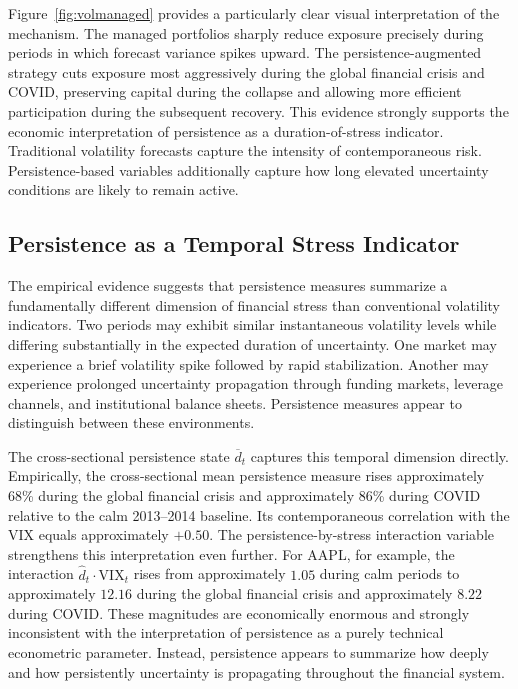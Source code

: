 \documentclass[unnumsec,webpdf,contemporary,large]{oup-authoring-template}%
\theoremstyle{thmstyleone}%
\theoremstyle{thmstyletwo}%
\theoremstyle{thmstylethree}%
\begin{document}

\FloatBarrier

Figure~\ref{fig:volmanaged} provides a particularly clear visual
interpretation of the mechanism. The managed portfolios sharply reduce
exposure precisely during periods in which forecast variance spikes upward.
The persistence-augmented strategy cuts exposure most aggressively during
the global financial crisis and COVID, preserving capital during the
collapse and allowing more efficient participation during the subsequent
recovery. This evidence strongly supports the economic interpretation of
persistence as a duration-of-stress indicator. Traditional volatility
forecasts capture the intensity of contemporaneous risk. Persistence-based
variables additionally capture how long elevated uncertainty conditions are
likely to remain active.





\subsection{Persistence as a Temporal Stress Indicator}

The empirical evidence suggests that persistence measures summarize a
fundamentally different dimension of financial stress than conventional
volatility indicators. Two periods may exhibit similar instantaneous
volatility levels while differing substantially in the expected duration of
uncertainty. One market may experience a brief volatility spike followed
by rapid stabilization. Another may experience prolonged uncertainty
propagation through funding markets, leverage channels, and institutional
balance sheets. Persistence measures appear to distinguish between these
environments.

The cross-sectional persistence state $\overline d_t$ captures this
temporal dimension directly. Empirically, the cross-sectional mean
persistence measure rises approximately 68\% during the global financial
crisis and approximately 86\% during COVID relative to the calm 2013--2014
baseline. Its contemporaneous correlation with the VIX equals approximately
$+0.50$. The persistence-by-stress interaction variable strengthens this
interpretation even further. For AAPL, for example, the interaction $ \hat{d}_t\!\cdot\!\mathrm{VIX}_t$ rises from approximately $1.05$ during calm
periods to approximately $12.16$ during the global financial crisis and
approximately $8.22$ during COVID. These magnitudes are economically
enormous and strongly inconsistent with the interpretation of persistence
as a purely technical econometric parameter. Instead, persistence appears
to summarize how deeply and how persistently uncertainty is propagating
throughout the financial system.
\end{document}

